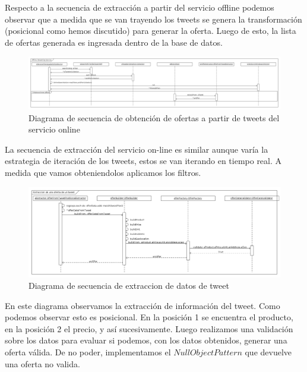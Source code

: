 Respecto a la secuencia de extracci\'on a partir del servicio offline podemos observar que a medida que se van trayendo los tweets se genera la transformaci\'on (posicional como hemos discutido) para generar la oferta. Luego de esto, la lista de ofertas generada es ingresada dentro de la base de datos.

\begin{figure}[h]
\centerline{\includegraphics[width=0.6\paperwidth]{./imgs/sequence_diagram_online_extraction.png}}
\caption{Diagrama de secuencia de obtención de ofertas a partir de tweets del servicio online}
\label{fig:sequence_diagram_online_extraction}
\end{figure}

La secuencia de extracci\'on del servicio on-line es similar aunque var\'ia la estrategia de iteraci\'on de los tweets, estos se van iterando en tiempo real. A medida que vamos obteniendolos aplicamos los filtros.

\begin{figure}[h]
\centerline{\includegraphics[width=0.6\paperwidth]{./imgs/sequence_diagram_parsing.png}}
\caption{Diagrama de secuencia de extraccion de datos de tweet}
\label{fig:secuence_parsing}
\end{figure}

En este diagrama observamos la extracci\'on de informaci\'on del tweet. Como podemos observar esto es posicional. En la posici\'on 1 se encuentra el producto, en la posici\'on 2 el precio, y as\'i sucesivamente.
Luego realizamos una validaci\'on sobre los datos para evaluar si podemos, con los datos obtenidos, generar una oferta v\'alida.
De no poder, implementamos el $NullObjectPattern$ que devuelve una oferta no valida.


